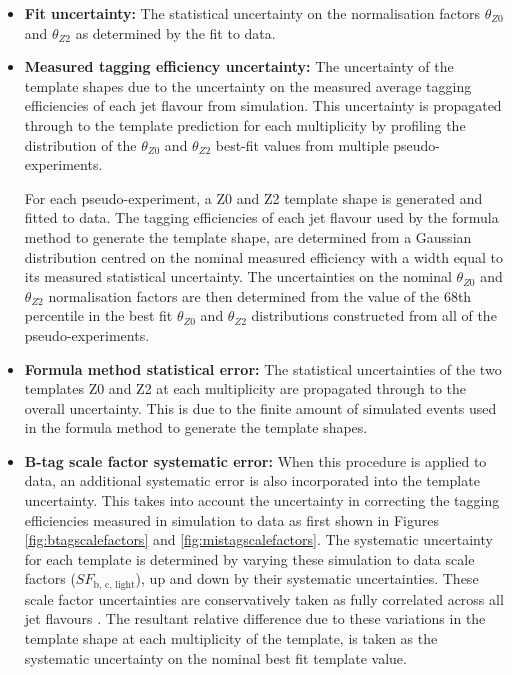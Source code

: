 \begin{itemize}
\item[]\textbf{Fit uncertainty:} 
 The statistical uncertainty on the normalisation factors $\theta_{Z0}$ and $\theta_{Z2}$ as determined by the fit to data.
\item[]\textbf{Measured tagging efficiency uncertainty:}  
The uncertainty of the template shapes due to the uncertainty on the measured average tagging efficiencies of each jet flavour from simulation. This uncertainty is propagated through to the template prediction for each \nbreco multiplicity by profiling the distribution of the $\theta_{Z0}$ and $\theta_{Z2}$ best-fit values from multiple pseudo-experiments. 

For each pseudo-experiment, a Z0 and Z2 template shape is generated and fitted to data. The tagging efficiencies of each jet flavour used by the formula method to generate the template shape, are determined from a Gaussian distribution centred on the nominal measured efficiency with a width equal to its measured statistical uncertainty. The uncertainties on the nominal $\theta_{Z0}$ and $\theta_{Z2}$ normalisation factors are then determined from the value of the 68th percentile in the best fit $\theta_{Z0}$ and $\theta_{Z2}$ distributions constructed from all of the pseudo-experiments.
\item[]\textbf{Formula method statistical error:}  The statistical uncertainties of the two templates Z0 and Z2 at each \nbreco multiplicity are propagated through to the overall uncertainty. This is due to the finite amount of simulated events used in the formula method to generate the template shapes.
\item[]\textbf{B-tag scale factor systematic error:} When this procedure is applied to data, an additional systematic error is also incorporated into the template uncertainty. This takes into account the uncertainty in correcting the tagging efficiencies measured in simulation to data as first shown in Figures  \ref{fig:btagscalefactors} and \ref{fig:mistagscalefactors}. The systematic uncertainty for each template is determined by varying these simulation to data scale factors ($SF_{\text{b, c, light}}$), up and down by their systematic uncertainties. These scale factor uncertainties are conservatively taken as fully correlated across all jet flavours \cite{btagscalefactor}. The resultant relative difference due to these variations in the template shape at each \nbreco multiplicity of the template, is taken as the systematic uncertainty on the nominal best fit template value.
\end{itemize} 

